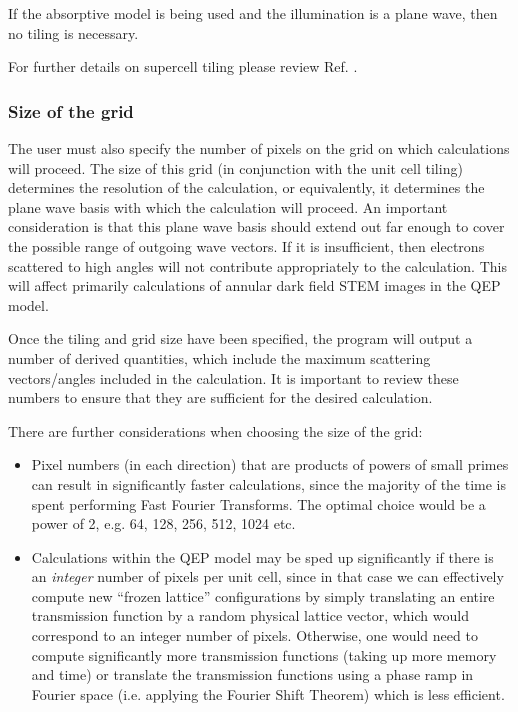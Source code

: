 \documentclass[12pt,a4paper]{article}
\begin{document}
If the absorptive model is being used and the illumination is a plane wave, then no tiling is necessary.

For further details on supercell tiling please review Ref. \cite{FAOR1}. 

\subsubsection{Size of the grid}

The user must also specify the number of pixels on the grid on which calculations will proceed.
The size of this grid (in conjunction with the unit cell tiling) determines the resolution of the calculation, or equivalently, it determines the plane wave basis with which the calculation will proceed.
An important consideration is that this plane wave basis should extend out far enough to cover the possible range of outgoing wave vectors.
If it is insufficient, then electrons scattered to high angles will not contribute appropriately to the calculation.
This will affect primarily calculations of annular dark field STEM images in the QEP model.

Once the tiling and grid size have been specified, the program will output a number of derived quantities, which include the maximum scattering vectors/angles included in the calculation.
It is important to review these numbers to ensure that they are sufficient for the desired calculation.

There are further considerations when choosing the size of the grid:
%
\begin{itemize}
    \item Pixel numbers (in each direction) that are products of powers of small primes can result in significantly faster calculations, since the majority of the time is spent performing Fast Fourier Transforms.
        The optimal choice would be a power of 2, e.g. 64, 128, 256, 512, 1024 etc.

    \item Calculations within the QEP model may be sped up significantly if there is an \emph{integer} number of pixels per unit cell, since in that case we can effectively compute new ``frozen lattice'' configurations by simply translating an entire transmission function by a random physical lattice vector, which would correspond to an integer number of pixels.
        Otherwise, one would need to compute significantly more transmission functions (taking up more memory and time) or translate the transmission functions using a phase ramp in Fourier space (i.e. applying the Fourier Shift Theorem) which is less efficient.
\end{itemize}
\end{document}
